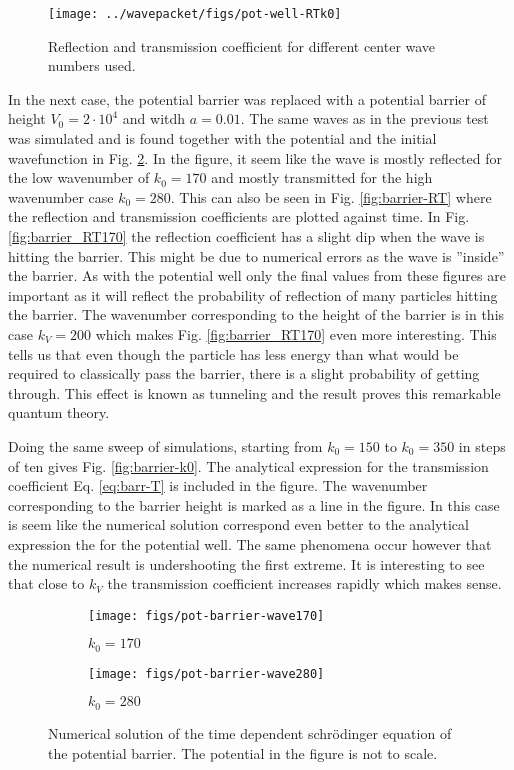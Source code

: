 \begin{figure}[H]
  \centering
  \texttt{[image: ../wavepacket/figs/pot-well-RTk0]}
  \caption{Reflection and transmission coefficient for different center wave numbers used.}
  \label{fig:well-k0}
\end{figure}

In the next case, the potential barrier was replaced with a potential barrier of height $V_0=2 \cdot 10^4$ and witdh $a=0.01$. The same waves as in the previous test was simulated and is found together with the potential and the initial wavefunction in Fig. \ref{fig:barrier-wave}. In the figure, it seem like the wave is mostly reflected for the low wavenumber of $k_0=170$ and mostly transmitted for the high wavenumber case $k_0=280$. This can also be seen in Fig. \ref{fig:barrier-RT} where the reflection and transmission coefficients are plotted against time. In Fig. \ref{fig:barrier_RT170} the reflection coefficient has a slight dip when the wave is hitting the barrier. This might be due to numerical errors as the wave is ''inside'' the barrier. As with the potential well only the final values from these figures are important as it will reflect the probability of reflection of many particles hitting the barrier. The wavenumber corresponding to the height of the barrier is in this case $k_V = 200$ which makes Fig. \ref{fig:barrier_RT170} even more interesting. This tells us that even though the particle has less energy than what would be required to classically pass the barrier, there is a slight probability of getting through. This effect is known as tunneling and the result proves this remarkable quantum theory.

Doing the same sweep of simulations, starting from $k_0 =150$ to $k_0 = 350$ in steps of ten gives Fig. \ref{fig:barrier-k0}. The analytical expression for the transmission coefficient Eq. \ref{eq:barr-T} is included in the figure. The wavenumber corresponding to the barrier height is marked as a line in the figure. In this case is seem like the numerical solution correspond even better to the analytical expression the for the potential well. The same phenomena occur however that the numerical result is undershooting the first extreme. It is interesting to see that close to $k_V$ the transmission coefficient increases rapidly which makes sense.


\begin{figure}[H]
  \centering
  \begin{subfigure}{0.49\textwidth}
  \texttt{[image: figs/pot-barrier-wave170]}
  \caption{$k_0 = 170$}
  \end{subfigure}
  \begin{subfigure}{0.49\textwidth}
  \texttt{[image: figs/pot-barrier-wave280]}
  \caption{$k_0 = 280$}
  \end{subfigure}
  \caption{Numerical solution of the time dependent schrödinger equation of the potential barrier. The potential in the figure is not to scale.}
  \label{fig:barrier-wave}
\end{figure}


